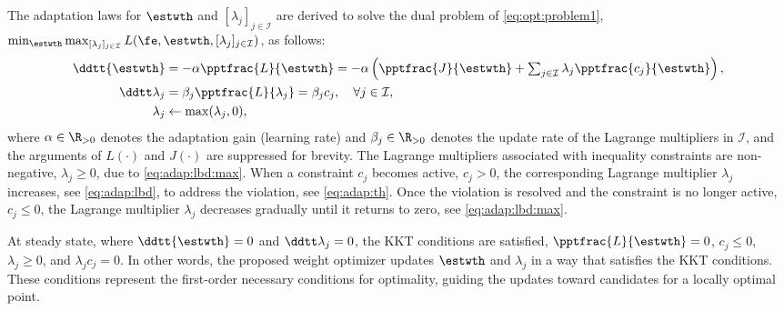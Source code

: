 \documentclass[letterpaper, journal]{IEEEtran}
\begin{document}
The adaptation laws for $\estwth$ and $[\lambda_j]_{j\in\mathcal I}$ are derived to solve the dual problem of \eqref{eq:opt:problem1}, \ie $\min_{\estwth} \max_{[\lambda_j]_{j\in\mathcal I}}L(\fe,\estwth,[\lambda_j]_{j\in\mathcal I})$, as follows:
\begin{subequations}
    \begin{align}
            \ddtt{\estwth}
            &
            =
            -\alpha \pptfrac{L}{\estwth}
            =
            -\alpha 
            \left(
                \pptfrac{J}{\estwth}
                +
                \textstyle\sum_{j\in\mathcal{I}}
                \lambda_j 
                \pptfrac{c_j}{\estwth}
            \right),
        \label{eq:adap:th}
            \\
            \ddtt\lambda_j
            & 
            = 
            \beta_j\pptfrac{L}{\lambda_j} 
            = 
            \beta_j c_j ,
            \quad \forall j\in\mathcal I,
        \label{eq:adap:lbd}
            \\
            \lambda_j & \leftarrow \max(\lambda_j,0) ,
        \label{eq:adap:lbd:max}
    \end{align}
    \label{eq:adaptation law}%
\end{subequations}
where $\alpha\in\R_{>0}$ denotes the adaptation gain (learning rate) and $\beta_j\in\R_{>0}$ denotes the update rate of the Lagrange multipliers in $\mathcal I$, and the arguments of $L(\cdot)$ and $J(\cdot)$ are suppressed for brevity. 
The Lagrange multipliers associated with inequality constraints are non-negative, \ie $\lambda_j\ge 0$, due to \eqref{eq:adap:lbd:max}. 
When a constraint $c_j$ becomes active, \ie $c_j > 0$, the corresponding Lagrange multiplier $\lambda_j$ increases, see \eqref{eq:adap:lbd}, to address the violation, see \eqref{eq:adap:th}.
Once the violation is resolved and the constraint is no longer active, \ie $c_j \le 0$, the Lagrange multiplier $\lambda_j$ decreases gradually until it returns to zero, see \eqref{eq:adap:lbd:max}.

At steady state, where $\ddtt{\estwth}=0$ and $\ddtt\lambda_j=0$, the KKT conditions are satisfied, \ie $\pptfrac{L}{\estwth}=0$, $c_j \le 0$, $\lambda_j \ge 0$, and $\lambda_j c_j=0$.
In other words, the proposed weight optimizer updates $\estwth$ and $\lambda_j$ in a way that satisfies the KKT conditions. 
These conditions represent the first-order necessary conditions for optimality, guiding the updates toward candidates for a locally optimal point.
\end{document}
